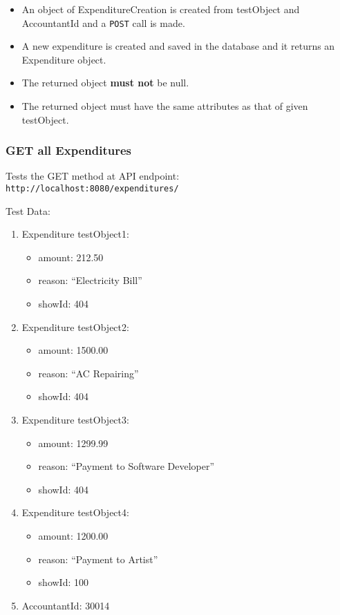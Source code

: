 \documentclass[]{article}
\providecommand{\tightlist}{%
  \setlength{\itemsep}{0pt}\setlength{\parskip}{0pt}}
\begin{document}
\begin{itemize}
\tightlist
\item
  An object of ExpenditureCreation is created from testObject and
  AccountantId and a \texttt{POST} call is made.
\item
  A new expenditure is created and saved in the database and it returns
  an Expenditure object.
\item
  The returned object \textbf{must not} be null.
\item
  The returned object must have the same attributes as that of given
  testObject.
\end{itemize}

\hypertarget{get-all-expenditures}{%
\subsubsection{GET all Expenditures}\label{get-all-expenditures}}

Tests the GET method at API endpoint:
\texttt{http://localhost:8080/expenditures/}

Test Data:

\begin{enumerate}
\def\labelenumi{\arabic{enumi}.}
\tightlist
\item
  Expenditure testObject1:

  \begin{itemize}
  \tightlist
  \item
    amount: 212.50
  \item
    reason: ``Electricity Bill''
  \item
    showId: 404
  \end{itemize}
\item
  Expenditure testObject2:

  \begin{itemize}
  \tightlist
  \item
    amount: 1500.00
  \item
    reason: ``AC Repairing''
  \item
    showId: 404
  \end{itemize}
\item
  Expenditure testObject3:

  \begin{itemize}
  \tightlist
  \item
    amount: 1299.99
  \item
    reason: ``Payment to Software Developer''
  \item
    showId: 404
  \end{itemize}
\item
  Expenditure testObject4:

  \begin{itemize}
  \tightlist
  \item
    amount: 1200.00
  \item
    reason: ``Payment to Artist''
  \item
    showId: 100
  \end{itemize}
\item
  AccountantId: 30014
\end{enumerate}
\end{document}
